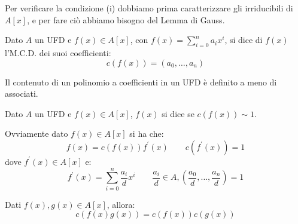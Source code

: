 \documentclass[11pt]{scrartcl}
\begin{document}
Per verificare la condizione (i) dobbiamo prima caratterizzare gli irriducibili di $A[x]$, e per fare ciò abbiamo bisogno del Lemma di Gauss.

\begin{definition}
    Dato $A$ un UFD e $f(x) \in A[x]$, con $f(x) = \sum_{i=0}^n a_ix^i$, si dice  di $f(x)$ l'M.C.D. dei suoi coefficienti:
    \[ c(f(x)) = (a_0,\ldots,a_n)
        \]
\end{definition}

\begin{remark}
    Il contenuto di un polinomio a coefficienti in un UFD è definito a meno di associati.
\end{remark}

\begin{definition}
    Dato $A$ un UFD e $f(x) \in A[x]$, $f(x)$ si dice  se $c(f(x)) \sim 1$.
\end{definition}

\begin{remark}
    Ovviamente dato $f(x) \in A[x]$ si ha che:
    \[ f(x) = c(f(x))f^{\prime}(x) \qquad c(f^{\prime}(x)) = 1
        \]
    dove $f^{\prime}(x) \in A[x]$ e:
    \[ f^{\prime}(x) = \sum_{i=0}^n \frac{a_i}{d}x^i \qquad \frac{a_i}{d} \in A, \left(\frac{a_0}{d},\ldots,\frac{a_n}{d}\right) = 1
        \]
\end{remark}

\begin{lemma}
    \label{gauss}
    Dati $f(x),g(x) \in A[x]$, allora:
    \[ c(f(x)g(x)) = c(f(x))c(g(x))
        \]
\end{lemma}
\end{document}
